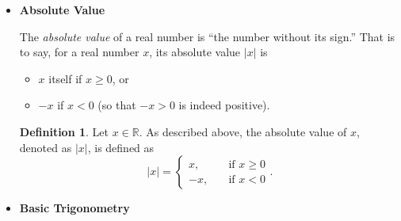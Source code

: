 \documentclass[
]{book}
\providecommand{\tightlist}{%
  \setlength{\itemsep}{0pt}\setlength{\parskip}{0pt}}
\theoremstyle{definition}
\newtheorem{definition}{Definition}[chapter]
\theoremstyle{definition}
\newtheorem{example}{Example}[chapter]
\theoremstyle{definition}
\theoremstyle{definition}
\theoremstyle{remark}
\begin{document}
\begin{itemize}
\begin{itemize}
\begin{example}
    \end{example}
  \item
    You should be able to evaluate/simplify expressions like this:

    \begin{example}
    \protect\hypertarget{exm:mix-exp}{}\label{exm:mix-exp}

    Evaluate \(\displaystyle \frac{27^{\frac{2}{3}}}{16^{\frac{5}{4}} \times 36^{-\frac{1}{2}}} \times \left(\frac{3}{2}\right)^{-3}\).

    Solution

    \begin{align*}
    \frac{27^{\frac{2}{3}}}{16^{\frac{5}{4}} \times 36^{-\frac{1}{2}}} \times \left(\frac{3}{2}\right)^{-3} 
    &= \frac{27^{\frac{2}{3}} \times 36^{\frac{1}{2}}}{16^{\frac{5}{4}}} \times \left(\frac{2}{3}\right)^{3} \\
    &= \frac{\left(\sqrt[3]{27}\right)^2 \times \sqrt{36}}{\left(\sqrt[4]{16}\right)^5} \times \frac{2^3}{3^3} \\
    &= \frac{3^2 \times 6}{2^5} \times \frac{2^3}{3^3} \\
    &= \frac{3^2 \times (2 \times 3) \times 2^3}{2^5 \times 3^3} \\
    &= \frac{3^3 \times 2^4}{2^5 \times 3^3} \\
    &= \frac{1}{2} .
    \end{align*}

    \end{example}
  \end{itemize}
\item
  \textbf{Absolute Value}

  The \emph{absolute value} of a real number is ``the number without its sign.'' That is to say, for a real number \(x\), its absolute value \(\lvert x \rvert\) is

  \begin{itemize}
  \tightlist
  \item
    \(x\) itself if \(x \ge 0\), or
  \item
    \(-x\) if \(x<0\) (so that \(-x>0\) is indeed positive).
  \end{itemize}

  \begin{definition}
  \protect\hypertarget{def:abs}{}\label{def:abs}Let \(x \in \mathbb{R}\). As described above, the absolute value of \(x\), denoted as \(\lvert x \rvert\), is defined as
  \[\lvert x \rvert = \begin{cases}x,\quad &\text{if } x \ge 0 \\ -x,\quad &\text{if } x < 0 \end{cases} .\]
  \end{definition}
\item
  \textbf{Basic Trigonometry}


\end{itemize}
\end{document}
